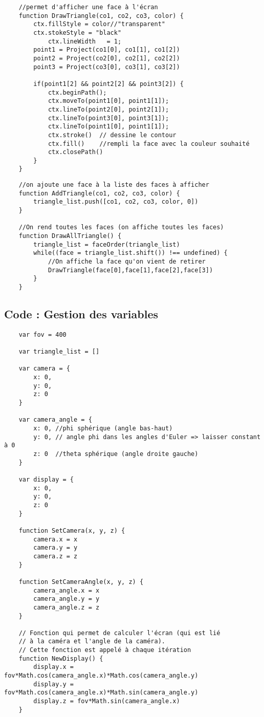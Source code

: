 \begin{verbatim}
    //permet d'afficher une face à l'écran
    function DrawTriangle(co1, co2, co3, color) {
    	ctx.fillStyle = color//"transparent"
    	ctx.stokeStyle = "black"
            ctx.lineWidth   = 1;
    	point1 = Project(co1[0], co1[1], co1[2])
    	point2 = Project(co2[0], co2[1], co2[2])
    	point3 = Project(co3[0], co3[1], co3[2])
    
    	if(point1[2] && point2[2] && point3[2]) {
    		ctx.beginPath();
    		ctx.moveTo(point1[0], point1[1]);
    		ctx.lineTo(point2[0], point2[1]);
    		ctx.lineTo(point3[0], point3[1]);
    		ctx.lineTo(point1[0], point1[1]);
    		ctx.stroke()  // dessine le contour
    		ctx.fill()    //rempli la face avec la couleur souhaité
    		ctx.closePath()
    	}
    }
\end{verbatim}
\begin{verbatim}
    //on ajoute une face à la liste des faces à afficher
    function AddTriangle(co1, co2, co3, color) {
    	triangle_list.push([co1, co2, co3, color, 0])
    }

    //On rend toutes les faces (on affiche toutes les faces)
    function DrawAllTriangle() {
        triangle_list = faceOrder(triangle_list)
        while((face = triangle_list.shift()) !== undefined) {
            //On affiche la face qu'on vient de retirer
            DrawTriangle(face[0],face[1],face[2],face[3])
        }
    }
\end{verbatim}

\clearpage
\subsection{Code : Gestion des variables}
\begin{verbatim}
    var fov = 400
    
    var triangle_list = []
    
    var camera = {
        x: 0,
        y: 0,
        z: 0
    }
    
    var camera_angle = {
        x: 0, //phi sphérique (angle bas-haut)
        y: 0, // angle phi dans les angles d'Euler => laisser constant à 0
        z: 0  //theta sphérique (angle droite gauche)
    }
    
    var display = {
        x: 0,
        y: 0,
        z: 0
    }
    
    function SetCamera(x, y, z) {
        camera.x = x
        camera.y = y
        camera.z = z
    }
    
    function SetCameraAngle(x, y, z) {
        camera_angle.x = x
        camera_angle.y = y
        camera_angle.z = z
    }

    // Fonction qui permet de calculer l'écran (qui est lié
    // à la caméra et l'angle de la caméra).
    // Cette fonction est appelé à chaque itération
    function NewDisplay() {
        display.x = fov*Math.cos(camera_angle.x)*Math.cos(camera_angle.y)
        display.y = fov*Math.cos(camera_angle.x)*Math.sin(camera_angle.y)
        display.z = fov*Math.sin(camera_angle.x)
    }
    
\end{verbatim}


